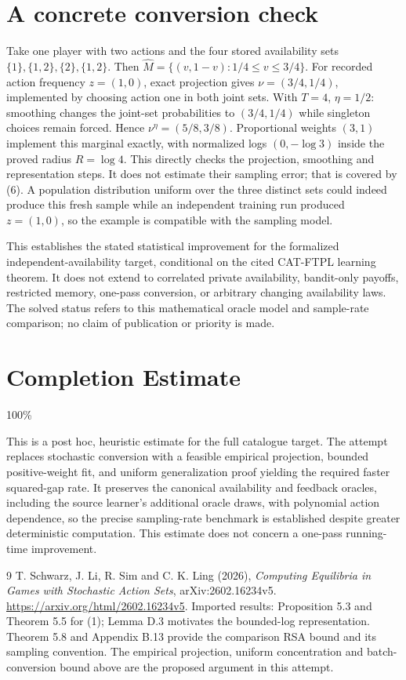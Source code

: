 \documentclass[11pt,a4paper]{article}
\begin{document}
\section{A concrete conversion check}
Take one player with two actions and the four stored availability sets $\{1\},\{1,2\},\{2\},\{1,2\}$. Then $\widehat M=\{(v,1-v):1/4\le v\le3/4\}$. For recorded action frequency $z=(1,0)$, exact projection gives $\nu=(3/4,1/4)$, implemented by choosing action one in both joint sets. With $T=4$, $\eta=1/2$: smoothing changes the joint-set probabilities to $(3/4,1/4)$ while singleton choices remain forced. Hence $\nu^\eta=(5/8,3/8)$. Proportional weights $(3,1)$ implement this marginal exactly, with normalized logs $(0,-\log3)$ inside the proved radius $R=\log4$. This directly checks the projection, smoothing and representation steps. It does not estimate their sampling error; that is covered by (6). A population distribution uniform over the three distinct sets could indeed produce this fresh sample while an independent training run produced $z=(1,0)$, so the example is compatible with the sampling model.

This establishes the stated statistical improvement for the formalized independent-availability target, conditional on the cited CAT-FTPL learning theorem. It does not extend to correlated private availability, bandit-only payoffs, restricted memory, one-pass conversion, or arbitrary changing availability laws. The solved status refers to this mathematical oracle model and sample-rate comparison; no claim of publication or priority is made.

\section{Completion Estimate}
100\%

This is a post hoc, heuristic estimate for the full catalogue target.
The attempt replaces stochastic conversion with a feasible empirical projection, bounded positive-weight fit, and uniform generalization proof yielding the required faster squared-gap rate. It preserves the canonical availability and feedback oracles, including the source learner's additional oracle draws, with polynomial action dependence, so the precise sampling-rate benchmark is established despite greater deterministic computation. This estimate does not concern a one-pass running-time improvement.

\begin{thebibliography}{9}
 T. Schwarz, J. Li, R. Sim and C. K. Ling (2026), \emph{Computing Equilibria in Games with Stochastic Action Sets}, arXiv:2602.16234v5. \url{https://arxiv.org/html/2602.16234v5}. Imported results: Proposition 5.3 and Theorem 5.5 for (1); Lemma D.3 motivates the bounded-log representation. Theorem 5.8 and Appendix B.13 provide the comparison RSA bound and its sampling convention. The empirical projection, uniform concentration and batch-conversion bound above are the proposed argument in this attempt.
\end{thebibliography}
\end{document}
